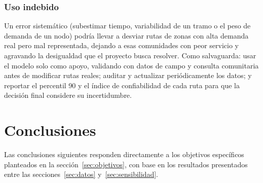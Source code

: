 \documentclass[11pt]{article}
\numberwithin{equation}{section}
\begin{document}
\subsubsection*{Uso indebido}

Un error sistemático (subestimar tiempo, variabilidad de un tramo o el peso de demanda de un nodo) podría llevar a desviar rutas de zonas con alta demanda real pero mal representada, dejando a esas comunidades con peor servicio y agravando la desigualdad que el proyecto busca resolver. Como salvaguarda: usar el modelo solo como apoyo, validando con datos de campo y consulta comunitaria antes de modificar rutas reales; auditar y actualizar periódicamente los datos; y reportar el percentil 90 y el índice de confiabilidad de cada ruta para que la decisión final considere su incertidumbre.

\section{Conclusiones}\label{sec:conclusiones}

Las conclusiones siguientes responden directamente a los objetivos específicos planteados en la sección~\ref{sec:objetivos}, con base en los resultados presentados entre las secciones~\ref{sec:datos} y~\ref{sec:sensibilidad}.
\end{document}
